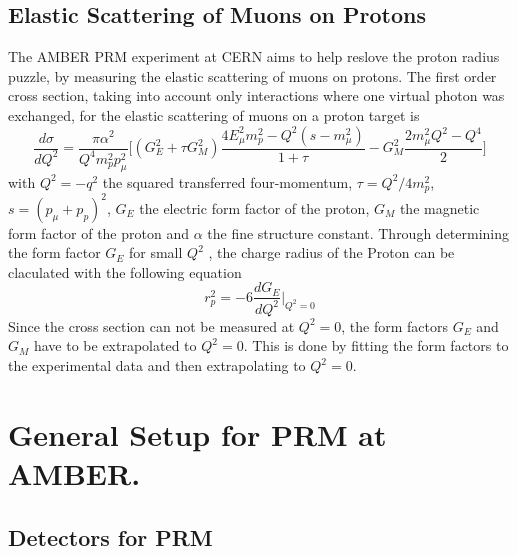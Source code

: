 \subsection{Elastic Scattering of Muons on Protons}
The AMBER PRM experiment at CERN aims to help reslove the proton radius puzzle, by measuring the elastic scattering of muons on protons.
The first order cross section, taking into account only interactions where one virtual photon was exchanged, 
for the elastic scattering of muons on a proton target is 
\begin{equation}
\label{eq:cross_section}
\frac{d\sigma}{dQ^2} = \frac{\pi \alpha^2}{Q^4 m_p^2 p_\mu^2} \bigg[ \left( G_E^2 + \tau G_M^2 \right) \frac{ 4E_\mu^2 m_p^2 
- Q^2 (s - m_\mu^2)}{1 + \tau }  - G_M^2 \frac{ 2m_\mu^2 Q^2 - Q^4}{2} \bigg]
\end{equation}
with  $Q^2 = -q^2$ 	the squared transferred four-momentum, $\tau = Q^2 / 4m_p^2$, $s = (p_\mu + p_p)^2$, 
 $G_E$ the electric form factor of the proton,
  $G_M$ the magnetic form factor of the proton and $\alpha$ the fine structure constant.\autocite{intentAmber}
Through determining the form factor $G_E$ for small $Q^2$ , the charge radius of the Proton can be claculated with the following equation\autocite{intentAmber}
\begin{equation}
\label{eq:charge_radius}
r_p^2 = -6 \frac{dG_E}{dQ^2} \bigg|_{Q^2 = 0}
\end{equation}
Since the cross section can not be measured at $Q^2 = 0$, the form factors $G_E$ and $G_M$ have to be extrapolated to $Q^2 = 0$.
This is done by fitting the form factors to the experimental data and then extrapolating to $Q^2 = 0$.\autocite{intentAmber}
\section{General Setup for PRM at AMBER.}\label{sec:general_setup}
\subsection{Detectors for PRM}

